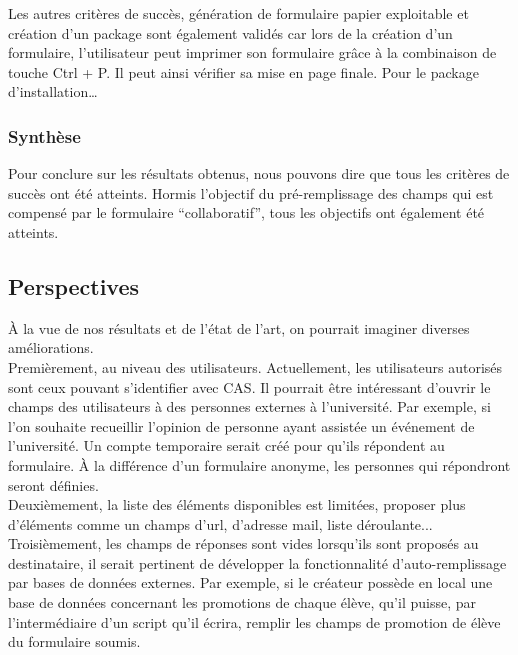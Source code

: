 \documentclass{sigplanconf}
\begin{document}
Les autres critères de succès, génération de formulaire papier exploitable et création d’un package sont également validés car lors de la création d’un formulaire, l’utilisateur peut imprimer son formulaire grâce à la combinaison de touche Ctrl + P. Il peut ainsi vérifier sa mise en page finale. Pour le package d’installation…
\subsubsection{Synthèse}
Pour conclure sur les résultats obtenus, nous pouvons dire que tous les critères de succès ont été atteints. Hormis l’objectif du pré-remplissage des champs qui est compensé par le formulaire “collaboratif”, tous les objectifs ont également été atteints.

\subsection{Perspectives}
À la vue de nos résultats et de l’état de l’art, on pourrait imaginer diverses améliorations.\\
Premièrement, au niveau des utilisateurs. Actuellement, les utilisateurs autorisés sont ceux pouvant s’identifier avec CAS. Il pourrait être intéressant d’ouvrir le champs des utilisateurs à des personnes externes à l’université. Par exemple, si l’on souhaite recueillir l'opinion de personne ayant assistée un événement de l’université. Un compte temporaire serait créé pour qu’ils répondent au formulaire. À la différence d’un formulaire anonyme, les personnes qui répondront seront définies.\\
Deuxièmement, la liste des éléments disponibles est limitées, proposer plus d’éléments comme un champs d’url, d'adresse mail, liste déroulante... \\
Troisièmement, les champs de réponses sont vides lorsqu’ils sont proposés au destinataire, il serait pertinent de développer la fonctionnalité d’auto-remplissage par bases de données externes. Par exemple, si le créateur possède en local une base de données concernant les promotions de chaque élève, qu’il puisse, par l’intermédiaire d’un script qu’il écrira, remplir les champs de promotion de élève du formulaire soumis.




\appendix
\end{document}
